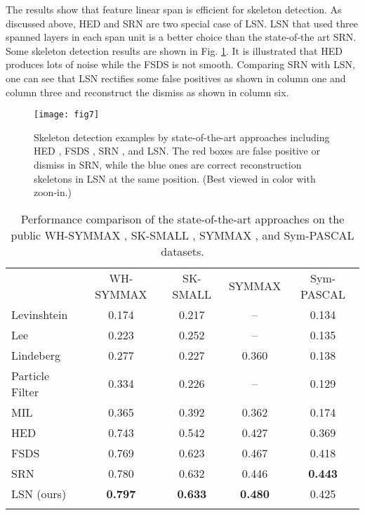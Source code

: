 \documentclass[runningheads]{llncs}
\begin{document}
The results show that feature linear span is efficient for skeleton detection. As discussed above, HED and SRN are two special case of LSN. LSN that used three spanned layers in each span unit is a better choice than the state-of-the art SRN. Some skeleton detection results are shown in Fig. \ref{fig::skeleton_examples}. It is illustrated that HED produces lots of noise while the FSDS is not smooth. Comparing SRN with LSN, one can see that LSN rectifies some false positives as shown in column one and column three and reconstruct the dismiss as shown in column six. 
\begin{figure}[h]
\centering
\texttt{[image: fig7]}
\caption{Skeleton detection examples by state-of-the-art approaches including HED \cite{ref6}, FSDS \cite{ref7}, SRN \cite{ref1}, and LSN. The red boxes are false positive or dismiss in SRN, while the blue ones are correct reconstruction skeletons in LSN at the same position. (Best viewed in color with zoon-in.)}
\label{fig::skeleton_examples}
\end{figure}
\setlength{\tabcolsep}{4pt}
\begin{table}
\begin{center}
\caption{Performance comparison  of the state-of-the-art approaches on the public WH-SYMMAX \cite{ref17}, SK-SMALL \cite{ref7}, SYMMAX \cite{ref15}, and Sym-PASCAL \cite{ref1} datasets.}
\begin{tabular}{lcccc}
\hline\noalign{\smallskip}
 & WH-SYMMAX  &SK-SMALL  &	SYMMAX  &	Sym-PASCAL \\
\noalign{\smallskip}
\hline
\noalign{\smallskip}
Levinshtein \cite{ref12} &	0.174 &	0.217 &	-- &	0.134 \\
Lee \cite{ref13} &	0.223 &	0.252 &	-- &	0.135 \\
Lindeberg \cite{ref37} &	0.277 &	0.227 &	0.360 &	0.138 \\
Particle Filter \cite{ref14} &	0.334 &	0.226 &	-- &	0.129 \\
MIL \cite{ref15} &	0.365 &	0.392 &	0.362 &	0.174 \\
\hline
HED \cite{ref6} &	0.743 &	0.542 &	0.427 &	0.369 \\
FSDS \cite{ref7} &	0.769 &	0.623 &	0.467 &	0.418 \\
SRN \cite{ref1} &	0.780 &	0.632 &	0.446 &	\textbf{0.443} \\
LSN (ours) &	\textbf{0.797} &	\textbf{0.633} &	\textbf{0.480} &	0.425 \\
\hline
\label{tab::four_datasets}
\end{tabular}
\end{center}
\end{table}
\setlength{\tabcolsep}{1.4pt}
\end{document}

